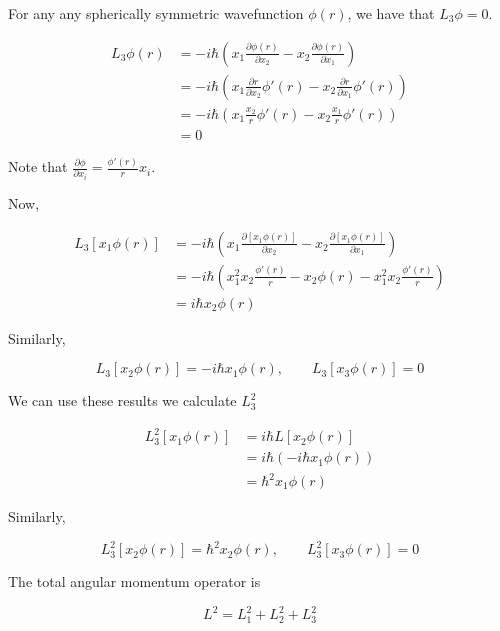 \documentclass[a4paper]{article}
\begin{document}
For any any spherically symmetric wavefunction $ \phi(r) $, we have that $ L_{3} \phi = 0$.

\begin{align*}
L_{3} \phi(r) & = - i \hbar \left(  x_{1} \frac{\partial \phi(r)}{\partial x_{2}}   - x_{2}  \frac{\partial \phi(r) }{\partial x_{1} }\right)      \\
& = - i \hbar \left(  x_{1} \frac{\partial r}{\partial x_{2}} \phi'(r)   - x_{2}  \frac{\partial r }{\partial x_{1} } \phi'(r) \right) \\
& = - i \hbar \left(  x_{1} \frac{x_{2}}{r} \phi'(r)   - x_{2}  \frac{x_{1}}{r} \phi'(r) \right) \\
& = 0                                                            
\end{align*}   

Note that $ \frac{\partial \phi }{\partial x_{i}} = \frac{\phi'(r)}{r} x_{i} $.

Now,

\begin{align*}
L_{3}[ x_{1} \phi(r) ] & = - i \hbar \left(  x_{1} \frac{\partial [ x_{1} \phi(r) ]}{\partial x_{2}}   - x_{2}  \frac{\partial [ x_{1} \phi(r) ]}{\partial x_{1} }\right)      \\
& = - i \hbar \left(  x_{1}^{2} x_{2} \frac{\phi'(r)}{r}   - x_{2} \phi(r) -  x_{1}^{2} x_{2} \frac{\phi'(r)}{r}  \right) \\
& =  i \hbar x_{2} \phi(r)                                                           
\end{align*} 

Similarly,

\[ L_{3}[ x_{2} \phi(r) ] = -i \hbar x_{1} \phi(r), \qquad L_{3}[x_{3}\phi(r)] = 0   \]


We can use these results we calculate $ L_{3}^{2} $

\begin{align*}
L_{3}^{2} [ x_{1} \phi(r) ] & = i \hbar  L [x_{2} \phi(r) ]\\
& = i \hbar (-i \hbar x_{1} \phi(r))\\
& = \hbar^{2} x_{1} \phi(r)
\end{align*}

Similarly,

\[ L_{3}^{2}[ x_{2} \phi(r) ] = \hbar^{2} x_{2} \phi(r), \qquad L_{3}^{2}[x_{3}\phi(r)] = 0   \]

The total angular momentum operator is 

\[ L^{2} = L_{1}^{2} + L_{2}^{2} + L_{3}^{2} \]
\end{document}
